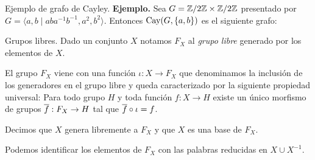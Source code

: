\documentclass[aspectratio=169, 10pt]{beamer}
\begin{document}
\begin{frame}[fragile]{Ejemplo de grafo de Cayley.}
	\textbf{Ejemplo.}
	Sea $G = \mathbb{Z}/2\mathbb{Z} \times \mathbb{Z}/2\mathbb{Z}$ presentado por $G = \langle a,b \mid aba^{-1}b^{-1}, a^{2}, b^{2}\rangle$.
	Entonces $\text{Cay}(G, \{a,b\})$ es el siguiente grafo: 
	
	\centering
		
\end{frame}

\begin{frame}[fragile]{Grupos libres.}
	Dado un conjunto $X$ notamos $F_{X}$ al \emph{grupo libre} generado por los elementos de $X$. 

	El grupo $F_{X}$ viene con una función $\iota: X \to F_{X}$ que denominamos la inclusión de los generadores en el grupo libre y queda caracterizado por la siguiente propiedad universal: 
	Para todo grupo $H$ y toda función $f:X \to H$ existe un único morfismo de grupos $\overline f: F_{X} \to H$ tal que $\overline f \circ \iota = f$.
	\begin{center}
	\end{center}

	Decimos que $X$ genera libremente a $F_{X}$ y que $X$ es una base de $F_{X}$.

	Podemos identificar los elementos de $F_{X}$ con las palabras reducidas en $X \cup X^{-1}$.
\end{frame}
\end{document}
